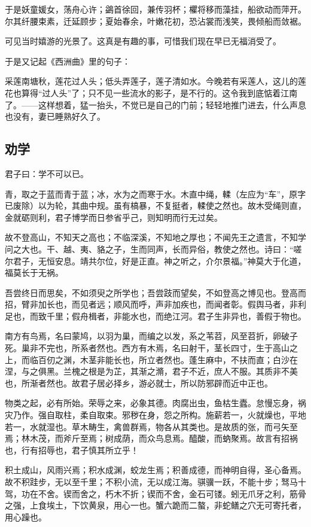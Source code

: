 于是妖童媛女，荡舟心许；鷁首徐回，兼传羽杯；欋将移而藻挂，船欲动而萍开。尔其纤腰束素，迁延顾步；夏始春余，叶嫩花初，恐沾裳而浅笑，畏倾船而敛裾。

可见当时嬉游的光景了。这真是有趣的事，可惜我们现在早已无福消受了。

于是又记起《西洲曲》里的句子：

采莲南塘秋，莲花过人头；低头弄莲子，莲子清如水。今晚若有采莲人，这儿的莲花也算得“过人头”了；只不见一些流水的影子，是不行的。这令我到底惦着江南了。——这样想着，猛一抬头，不觉已是自己的门前；轻轻地推门进去，什么声息也没有，妻已睡熟好久了。

\subsection{劝学}
君子曰：学不可以已。

青，取之于蓝而青于蓝；冰，水为之而寒于水。木直中绳，輮（左应为“车”，原字已废除）以为轮，其曲中规。虽有槁暴，不复挺者，輮使之然也。故木受绳则直，金就砺则利，君子博学而日参省乎己，则知明而行无过矣。

故不登高山，不知天之高也；不临深溪，不知地之厚也；不闻先王之遗言，不知学问之大也。干、越、夷、貉之子，生而同声，长而异俗，教使之然也。诗曰：“嗟尔君子，无恒安息。靖共尔位，好是正直。神之听之，介尔景福。”神莫大于化道，福莫长于无祸。

吾尝终日而思矣，不如须臾之所学也；吾尝跂而望矣，不如登高之博见也。登高而招，臂非加长也，而见者远；顺风而呼，声非加疾也，而闻者彰。假舆马者，非利足也，而致千里；假舟楫者，非能水也，而绝江河。君子生非异也，善假于物也。

南方有鸟焉，名曰蒙鸠，以羽为巢，而编之以发，系之苇苕，风至苕折，卵破子死。巢非不完也，所系者然也。西方有木焉，名曰射干，茎长四寸，生于高山之上，而临百仞之渊，木茎非能长也，所立者然也。蓬生麻中，不扶而直；白沙在涅，与之俱黑。兰槐之根是为芷，其渐之滫，君子不近，庶人不服。其质非不美也，所渐者然也。故君子居必择乡，游必就士，所以防邪辟而近中正也。

物类之起，必有所始。荣辱之来，必象其德。肉腐出虫，鱼枯生蠹。怠慢忘身，祸灾乃作。强自取柱，柔自取束。邪秽在身，怨之所构。施薪若一，火就燥也，平地若一，水就湿也。草木畴生，禽兽群焉，物各从其类也。是故质的张，而弓矢至焉；林木茂，而斧斤至焉；树成荫，而众鸟息焉。醯酸，而蚋聚焉。故言有招祸也，行有招辱也，君子慎其所立乎！

积土成山，风雨兴焉；积水成渊，蛟龙生焉；积善成德，而神明自得，圣心备焉。故不积跬步，无以至千里；不积小流，无以成江海。骐骥一跃，不能十步；驽马十驾，功在不舍。锲而舍之，朽木不折；锲而不舍，金石可镂。蚓无爪牙之利，筋骨之强，上食埃土，下饮黄泉，用心一也。蟹六跪而二螯，非蛇鳝之穴无可寄托者，用心躁也。

